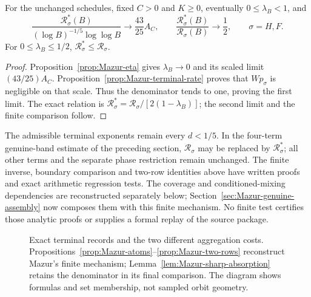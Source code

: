 \begin{corollary}
\label{cor:Mazur-sharp-terminal}
For the unchanged schedules, fixed $C>0$ and $K\ge0$, eventually
$0\le\lambda_B<1$, and
\[
 \frac{\mathcal R_\sigma^*(B)}{(\log B)^{-1/5}\log\log B}
       \longrightarrow\frac{43}{25}A_C,\qquad
 \frac{\mathcal R_\sigma^*(B)}{\mathcal R_\sigma(B)}
       \longrightarrow\frac12,\qquad \sigma=H,F.
\]
For $0\le\lambda_B\le1/2$, $\mathcal R_\sigma^*\le\mathcal R_\sigma$.
\end{corollary}
\begin{proof}
Proposition~\ref{prop:Mazur-eta} gives $\lambda_B\to0$ and its
scaled limit $(43/25)A_C$. Proposition~\ref{prop:Mazur-terminal-rate}
proves that $Wp_\sigma$ is negligible on that scale.
Thus the denominator tends to one, proving the first limit.
The exact relation is
$\mathcal R_\sigma^*=\mathcal R_\sigma/[2(1-\lambda_B)]$;
the second limit and the finite comparison follow.
\end{proof}

The admissible terminal exponents remain every $d<1/5$.
In the four-term genuine-band estimate of the preceding section,
$\mathcal R_\sigma$ may be replaced by $\mathcal R_\sigma^*$;
all other terms and the separate phase restriction remain unchanged.
The finite inverse, boundary comparison and two-row identities above
have written proofs and exact arithmetic regression tests.
The coverage and conditioned-mixing dependencies are reconstructed
separately below; Section~\ref{sec:Mazur-genuine-assembly} now composes them
with this finite mechanism. No finite test certifies those analytic proofs
or supplies a formal replay of the source package.

\begin{figure}[ht]
\centering
{}
\caption{Exact terminal records and the two different aggregation costs.
Propositions~\ref{prop:Mazur-atoms}--\ref{prop:Mazur-two-rows}
reconstruct Mazur's finite mechanism; Lemma~\ref{lem:Mazur-sharp-absorption}
retains the denominator in its final comparison. The diagram shows
formulas and set membership, not sampled orbit geometry.}
\label{fig:Mazur-finite}
\end{figure}

